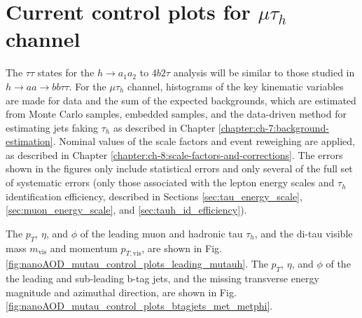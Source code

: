 \section{Current control plots for \texorpdfstring{$\mu\tau_{h}$}{mutauh} channel}
\label{section:a1a2_control_plots}
The $\tau\tau$ states for the $h \rightarrow a_1 a_2$ to $4b2\tau$ analysis will be similar to those studied in $h\rightarrow aa \rightarrow bb\tau\tau$. For the $\mu\tau_{h}$ channel, histograms of the key kinematic variables are made for data and the sum of the expected backgrounds, which are estimated from Monte Carlo samples, embedded samples, and the data-driven method for estimating jets faking $\tau_{h}$ as described in Chapter \ref{chapter:ch-7:background-estimation}. Nominal values of the scale factors and event reweighing are applied, as described in Chapter \ref{chapter:ch-8:scale-factors-and-corrections}. The errors shown in the figures only include statistical errors and only several of the full set of systematic errors (only those associated with the lepton energy scales and $\tau_{h}$ identification efficiency, described in Sections \ref{sec:tau_energy_scale}, \ref{sec:muon_energy_scale}, and \ref{sec:tauh_id_efficiency}). 

The $p_{T}$, $\eta$, and $\phi$ of the leading muon and hadronic tau $\tau_{h}$, and the di-tau visible mass $m_{\text{vis}}$ and momentum $p_{T, \text{vis}}$, are shown in Fig. \ref{fig:nanoAOD_mutau_control_plots_leading_mutauh}. The $p_{T}$, $\eta$, and $\phi$ of the the leading and sub-leading b-tag jets, and the missing transverse energy magnitude and azimuthal direction, are shown in Fig. \ref{fig:nanoAOD_mutau_control_plots_btagjets_met_metphi}.

